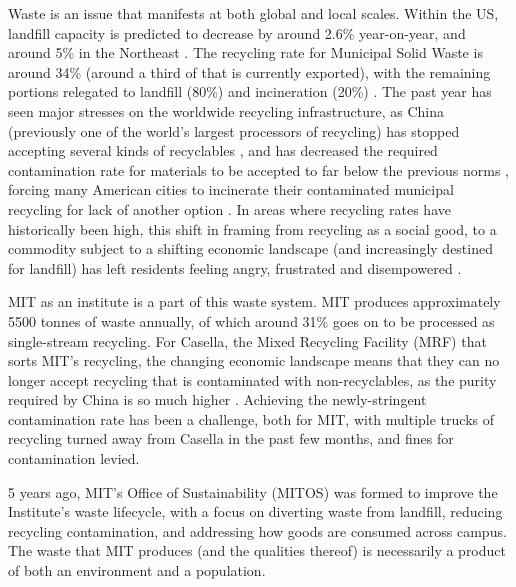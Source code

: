 \documentclass[nofonts,nols,justified,nobib]{tufte-book}
\begin{document}
Waste is an issue that manifests at both global and local scales. Within the US, landfill capacity is predicted to decrease by around 2.6\% year-on-year, and around 5\% in the Northeast \cite{waste_business_journal_waste_2017}. The recycling rate for Municipal Solid Waste is around 34\% (around a third of that is currently exported), with the remaining portions relegated to landfill (80\%) and incineration (20\%) \cite{epa_advancing_2018}. The past year has seen major stresses on the worldwide recycling infrastructure, as China (previously one of the world's largest processors of recycling) has stopped accepting several kinds of recyclables \cite{albeck-ripka_your_2018}, and has decreased the required contamination rate for materials to be accepted to far below the previous norms \cite{germin_chinas_2018}, forcing many American cities to incinerate their contaminated municipal recycling for lack of another option \cite{milman_moment_2019, albeck-ripka_your_2018}. In areas where recycling rates have historically been high, this shift in framing from recycling as a social good, to a commodity subject to a shifting economic landscape (and increasingly destined for landfill) has left residents feeling angry, frustrated and disempowered \cite{albeck-ripka_your_2018}.

MIT as an institute is a part of this waste system. MIT produces approximately 5500 tonnes of waste annually, of which around 31\% goes on to be processed as single-stream recycling. For Casella, the Mixed Recycling Facility (MRF) that sorts MIT's recycling, the changing economic landscape means that they can no longer accept recycling that is contaminated with non-recyclables, as the purity required by China is so much higher \cite{casella_2018_2018}. Achieving the newly-stringent contamination rate has been a challenge, both for MIT, with multiple trucks of recycling turned away from Casella in the past few months, and fines for contamination levied.

5 years ago, MIT's Office of Sustainability (MITOS) was formed to improve the Institute's waste lifecycle, with a focus on diverting waste from landfill, reducing recycling contamination, and addressing how goods are consumed across campus. The waste that MIT produces (and the qualities thereof) is necessarily a product of both an environment and a population.

\end{document}
